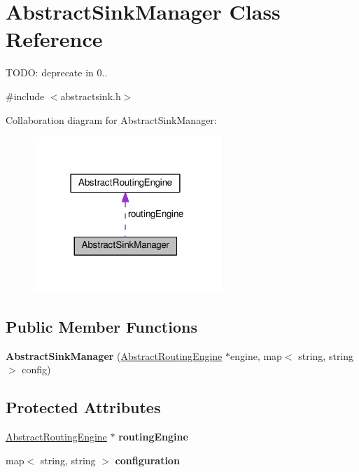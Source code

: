 \hypertarget{classAbstractSinkManager}{\section{Abstract\+Sink\+Manager Class Reference}
\label{classAbstractSinkManager}
}


T\+O\+D\+O\+: deprecate in 0..  




{\ttfamily \#include $<$abstractsink.\+h$>$}



Collaboration diagram for Abstract\+Sink\+Manager\+:\nopagebreak
\begin{figure}[H]
\begin{center}
\leavevmode
\includegraphics[width=202pt]{classAbstractSinkManager__coll__graph}
\end{center}
\end{figure}
\subsection*{Public Member Functions}
\begin{DoxyCompactItemize}
\item 
\hypertarget{classAbstractSinkManager_a8c2b065455e7392bbef66056e492cf54}{{\bfseries Abstract\+Sink\+Manager} (\hyperlink{classAbstractRoutingEngine}{Abstract\+Routing\+Engine} $\ast$engine, map$<$ string, string $>$ config)}\label{classAbstractSinkManager_a8c2b065455e7392bbef66056e492cf54}

\end{DoxyCompactItemize}
\subsection*{Protected Attributes}
\begin{DoxyCompactItemize}
\item 
\hypertarget{classAbstractSinkManager_aa4951761c33e7012c3a0e72e099354b3}{\hyperlink{classAbstractRoutingEngine}{Abstract\+Routing\+Engine} $\ast$ {\bfseries routing\+Engine}}\label{classAbstractSinkManager_aa4951761c33e7012c3a0e72e099354b3}

\item 
\hypertarget{classAbstractSinkManager_ac329710da75b1c757584ec42a8072ea4}{map$<$ string, string $>$ {\bfseries configuration}}\label{classAbstractSinkManager_ac329710da75b1c757584ec42a8072ea4}

\end{DoxyCompactItemize}



